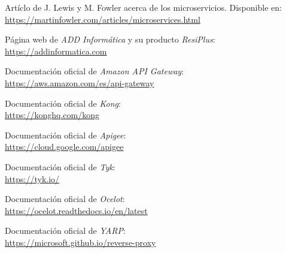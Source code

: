 \documentclass[11pt,spanish,listoffigures]{tfgetsinf}
\begin{document}
\begin{thebibliography}{10}

	Artíclo de J. Lewis y M. Fowler acerca de los microservicios.
	\newblock Disponible en:\\
	\url{https://martinfowler.com/articles/microservices.html}

	Página web de \emph{ADD Informática} y su producto \emph{ResiPlus}:\\
	\url{https://addinformatica.com}

	Documentación oficial de \emph{Amazon API Gateway}:\\
	\url{https://aws.amazon.com/es/api-gateway}
	
	Documentación oficial de \emph{Kong}:\\
	\url{https://konghq.com/kong}
	
	Documentación oficial de \emph{Apigee}:\\
	\url{https://cloud.google.com/apigee}
	
	Documentación oficial de \emph{Tyk}:\\
	\url{https://tyk.io/}

	Documentación oficial de \emph{Ocelot}:\\
	\url{https://ocelot.readthedocs.io/en/latest}

	Documentación oficial de \emph{YARP}:\\
	\url{https://microsoft.github.io/reverse-proxy}

\end{thebibliography}
\end{document}
